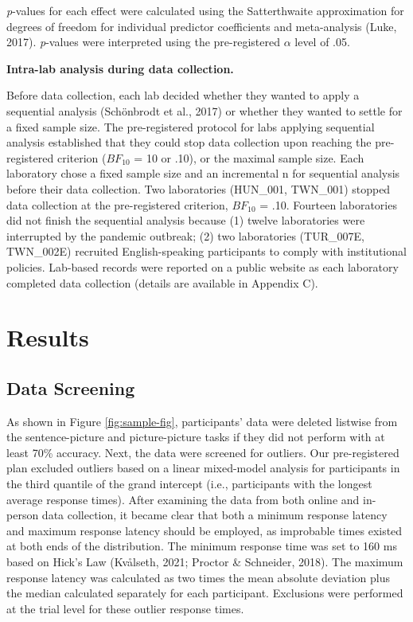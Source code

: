 \documentclass[
  man,floatsintext]{apa7}
\begin{document}
\emph{p}-values for each effect were calculated using the Satterthwaite
approximation for degrees of freedom for individual predictor
coefficients and meta-analysis (Luke, 2017).
\emph{p}-values were interpreted using the pre-registered \(\alpha\) level of
.05.

\textbf{Intra-lab analysis during data collection.}

Before data collection, each lab decided whether they wanted to apply a
sequential analysis (Schönbrodt et al., 2017) or
whether they wanted to settle for a fixed sample size. The
pre-registered protocol for labs applying sequential analysis
established that they could stop data collection upon reaching the
pre-registered criterion (\(BF_{10}\) = 10 or .10), or the maximal sample
size. Each laboratory chose a fixed sample size and an incremental n for
sequential analysis before their data collection. Two laboratories
(HUN\_001, TWN\_001) stopped data collection at the pre-registered
criterion, \(BF_{10}\) = .10. Fourteen laboratories did not finish the
sequential analysis because (1) twelve laboratories were interrupted by
the pandemic outbreak; (2) two laboratories (TUR\_007E, TWN\_002E)
recruited English-speaking participants to comply with institutional
policies. Lab-based records were reported on a public website as each
laboratory completed data collection (details are available in Appendix
C).

\hypertarget{results}{%
\section{Results}\label{results}}

\hypertarget{data-screening}{%
\subsection{Data Screening}\label{data-screening}}

As shown in Figure \ref{fig:sample-fig}, participants' data were
deleted listwise from the sentence-picture and picture-picture tasks if
they did not perform with at least 70\% accuracy. Next, the data were
screened for outliers. Our pre-registered plan excluded outliers based
on a linear mixed-model analysis for participants in the third quantile
of the grand intercept (i.e., participants with the longest average
response times). After examining the data from both online and in-person
data collection, it became clear that both a minimum response latency
and maximum response latency should be employed, as improbable times
existed at both ends of the distribution. The minimum response time was
set to 160 ms based on Hick's Law (Kvålseth, 2021; Proctor \& Schneider, 2018). The maximum response latency was calculated
as two times the mean absolute deviation plus the median calculated
separately for each participant. Exclusions were performed at the trial
level for these outlier response times.
\end{document}

